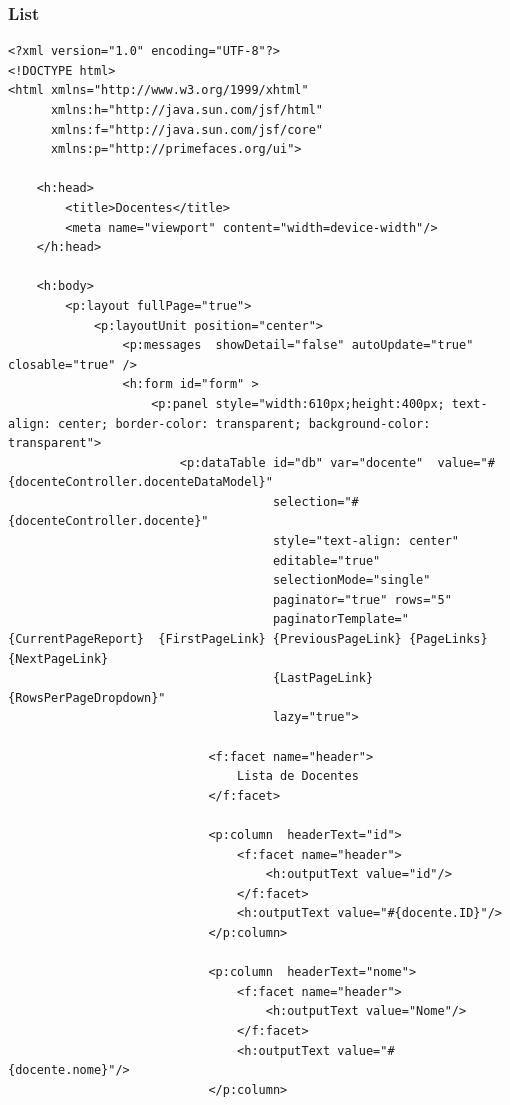 \documentclass[12pt,a4paper]{article}
\begin{document}
\subsubsection{List}
\label{subsubsectionDocenteView}
\begin{lstlisting}
<?xml version="1.0" encoding="UTF-8"?>
<!DOCTYPE html>
<html xmlns="http://www.w3.org/1999/xhtml"
      xmlns:h="http://java.sun.com/jsf/html"
      xmlns:f="http://java.sun.com/jsf/core"
      xmlns:p="http://primefaces.org/ui">

    <h:head>
        <title>Docentes</title>
        <meta name="viewport" content="width=device-width"/>
    </h:head>

    <h:body>
        <p:layout fullPage="true">
            <p:layoutUnit position="center">
                <p:messages  showDetail="false" autoUpdate="true" closable="true" />
                <h:form id="form" >
                    <p:panel style="width:610px;height:400px; text-align: center; border-color: transparent; background-color: transparent">  
                        <p:dataTable id="db" var="docente"  value="#{docenteController.docenteDataModel}"
                                     selection="#{docenteController.docente}"
                                     style="text-align: center" 
                                     editable="true"
                                     selectionMode="single"
                                     paginator="true" rows="5"  
                                     paginatorTemplate="{CurrentPageReport}  {FirstPageLink} {PreviousPageLink} {PageLinks} {NextPageLink} 
                                     {LastPageLink} {RowsPerPageDropdown}"
                                     lazy="true">  

                            <f:facet name="header">  
                                Lista de Docentes
                            </f:facet>  

                            <p:column  headerText="id">
                                <f:facet name="header">
                                    <h:outputText value="id"/>
                                </f:facet>
                                <h:outputText value="#{docente.ID}"/>
                            </p:column>

                            <p:column  headerText="nome">  
                                <f:facet name="header">
                                    <h:outputText value="Nome"/>
                                </f:facet>
                                <h:outputText value="#{docente.nome}"/>
                            </p:column> 


\end{lstlisting}
\end{document}

